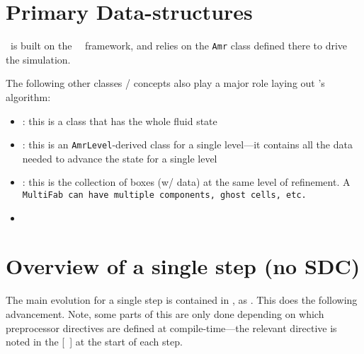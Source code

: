 \section{Primary Data-structures}

\castro\ is built on the \cpp\ \boxlib\ framework, and relies on the
{\tt Amr} class defined there to drive the simulation.

The following other classes / concepts also play a major role laying
out \castro's algorithm:
\begin{itemize}
\item {} : this is a class that has the whole fluid state 

\item {} : this is an {\tt AmrLevel}-derived class for a
  single level---it contains all the data needed to advance the state
  for a single level

\item {} : this is the collection of boxes (w/ data) at the 
  same level of refinement.  A \tt {\tt MultiFab} can have multiple
  components, ghost cells, etc.  

\item \code{\statedata}

\end{itemize}


\section{Overview of a single step (no SDC)}

The main evolution for a single step is contained in
, as .  This does
the following advancement.  Note, some parts of this are only done
depending on which preprocessor directives are defined at
compile-time---the relevant directive is noted in the [\ ] at the start
of each step.

